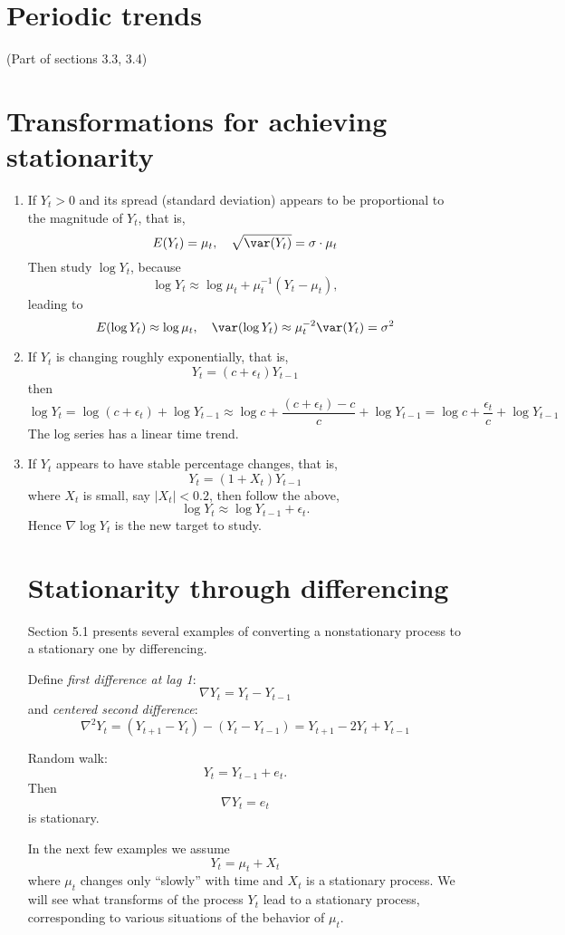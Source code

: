 \documentclass[12pt]{article}
\begin{document}
\section{Periodic trends}

(Part of sections 3.3, 3.4)


\section{Transformations for achieving stationarity}

\begin{enumerate}
\item If $Y_t > 0$ and its spread (standard deviation) appears to be
proportional to the magnitude of $Y_t$, that is,
\[
E(Y_t) = \mu_t,\quad
\sqrt{\var(Y_t)} = \sigma \cdot \mu_t
\]
Then study $\log Y_t$, because
\[
\log Y_t \approx \log \mu_t + \mu_t^{-1} (Y_t - \mu_t),
\]
leading to
\[
E(\log Y_t) \approx \log \mu_t,\quad
\var(\log Y_t) \approx \mu_t^{-2} \var(Y_t) = \sigma^2
\]

\item If $Y_t$ is changing roughly exponentially, that is,
\[
Y_t = (c + \epsilon_t) Y_{t-1}
\]
then
\[
\log Y_t
= \log(c + \epsilon_t) + \log Y_{t-1}
\approx \log c + \frac{(c + \epsilon_t) - c}{c} + \log Y_{t-1}
= \log c + \frac{\epsilon_t}{c} + \log Y_{t-1}
\]
The log series has a linear time trend.

\item If $Y_t$ appears to have stable percentage changes, that is,
\[
Y_t = (1 + X_t) Y_{t-1}
\]
where $X_t$ is small, say $|X_t| < 0.2$, then follow the above,
\[
\log Y_t
\approx \log Y_{t-1} + \epsilon_t
.
\]
Hence $\nabla \log Y_t$ is the new target to study.


\section{Stationarity through differencing}

Section 5.1 presents several examples of converting a nonstationary process
to a stationary one by differencing.

Define \emph{first difference at lag 1}:
\[
\nabla Y_t = Y_t - Y_{t-1}
\]
and \emph{centered second difference}:
\[
\nabla^2 Y_t = (Y_{t+1} - Y_t) - (Y_t - Y_{t-1})
            = Y_{t+1} - 2Y_t + Y_{t-1}
\]


\example Random walk:
\[
Y_t = Y_{t-1} + e_t.
\]
Then
\[
\nabla Y_t = e_t
\]
is stationary.

In the next few examples we assume
\[
Y_t = \mu_t + X_t
\]
where $\mu_t$ changes only ``slowly'' with time and $X_t$ is a
stationary process.
We will see what transforms of the process $Y_t$
lead to a stationary process, corresponding to various situations
of the behavior of $\mu_t$.


\end{enumerate}
\end{document}
